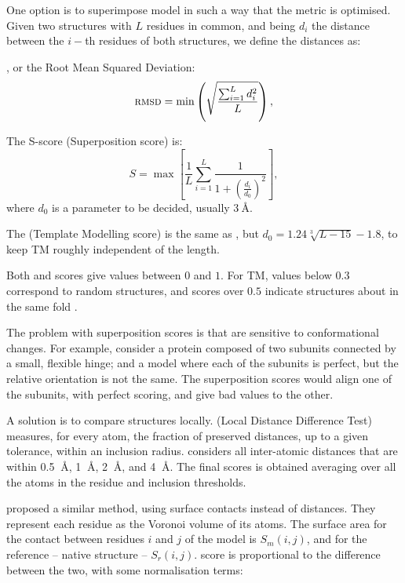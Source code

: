 One option is to superimpose model in such a way that the metric is optimised. 
Given two structures with $L$ residues in common, and being $d_i$ the distance between the $i-$th residues of both structures, we define the distances as:

\RMSD, or the Root Mean Squared Deviation:
\begin{equation*}
\textsc{rmsd} = \min \left(\sqrt{\frac{\sum_{i=1}^L d_i^2}{L}}\right),
\end{equation*}

The S-score (Superposition score) is:
\begin{equation*}
S = \max\left[\frac{1}{L} \sum_{i=1}^L \frac{1}{1 + \left(\frac{d_i}{d_0}\right)^2}\right],
\end{equation*}
where $d_0$ is a parameter to be decided, usually 3$\SI{}{\angstrom}$.

The \TM{} (Template Modelling score) is the same as \Ss, but $d_0 = 1.24 \sqrt[3]{L - 15} - 1.8$, to keep TM roughly independent of the length.

Both \Ss{} and \TM{} scores give values between $0$ and $1$.
For TM, values below $0.3$ correspond to random structures, and scores over $0.5$ indicate structures about in the same fold \citep{tmscore05}.

The problem with superposition scores is that are sensitive to conformational changes.
For example, consider a protein composed of two subunits connected by a small, flexible hinge; and a model where each of the subunits is perfect, but the relative orientation is not the same.
The superposition scores would align one of the subunits, with perfect scoring, and give bad values to the other.

A solution is to compare structures locally. 
\LDDT{} (Local Distance Difference Test) \citep{lddt} 
measures, for every atom, the fraction of preserved  distances, up to a given tolerance, within an inclusion radius.
\LDDT{} considers all inter-atomic distances that are within 0.5 $\SI{}{\angstrom}$, 1 $\SI{}{\angstrom}$, 2 $\SI{}{\angstrom}$, and 4 $\SI{}{\angstrom}$.
The final scores is obtained averaging over all the atoms in the residue and inclusion thresholds.

\citet{cad} proposed a similar method, using surface contacts instead of distances. 
They represent each residue as the Voronoi volume of its atoms.
The surface area for the contact between residues $i$ and $j$ of the model is $S_m(i,j)$, and for the reference -- native structure -- $S_r(i,j)$.
\CAD{} score is proportional to the difference between the two, with some normalisation terms:

